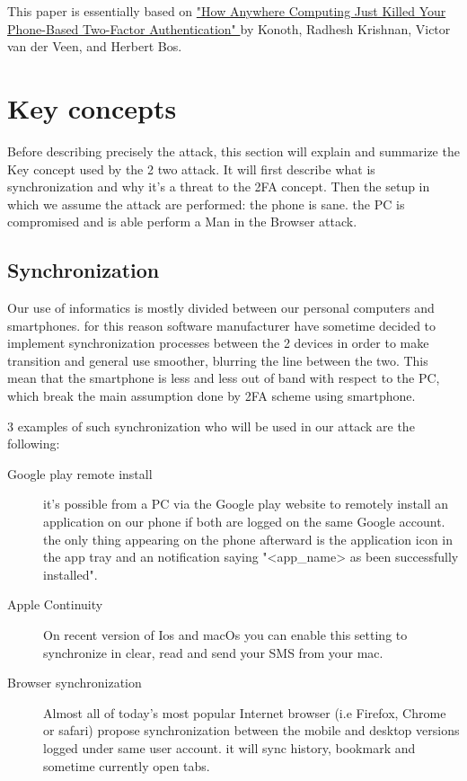 \documentclass[11pt, a4paper,twocolumn]{article}
\begin{document}
This paper is essentially based on \href{http://fc16.ifca.ai/preproceedings/24_Konoth.pdf}{"How Anywhere Computing Just Killed Your Phone-Based Two-Factor Authentication" } by  Konoth, Radhesh Krishnan, Victor van der Veen, and Herbert Bos. \cite{Base}

\section{Key concepts}
Before describing precisely the attack, this section will explain and summarize the Key concept used by the 2 two attack. It will first describe what is synchronization and why it's a threat to the 2FA concept. Then the setup in which we assume the attack are performed: the phone is sane. the PC is compromised and is able perform a Man in the Browser attack.
\subsection{Synchronization}
Our use of informatics is mostly divided between our personal computers 
and smartphones. for this reason software manufacturer have sometime decided to implement synchronization processes between the 2 devices in order to make transition and general use smoother, blurring the line between the two. This mean that the smartphone is less and less out of band with respect to the PC, which break the main assumption done by 2FA scheme using smartphone.

3 examples of such synchronization who will be used in our attack are the 
following:
\begin{description}
  \item[Google play remote install] it's possible from a PC via the Google play website to remotely install an application on our phone if both are logged on the same Google account. the only thing appearing on the phone afterward is the application icon in the app tray and an notification saying "<app\_name> as been successfully installed".
  
  \item[Apple Continuity] On recent version of Ios and macOs you can enable this setting to synchronize in clear, read and send your SMS from your mac.
  
  \item[Browser synchronization] Almost all of today's most popular Internet browser (i.e Firefox, Chrome or safari) propose synchronization between the mobile and desktop versions logged under same user account. it will sync history, bookmark and sometime currently open tabs.
\end{description}
\end{document}
